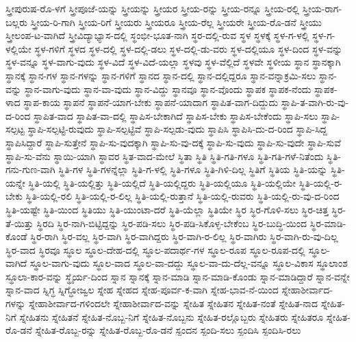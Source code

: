 ಸ್ತ್ರೀಪುರುಷ-ರೊ-ಳಗೆ
ಸ್ತ್ರೀಪೂಜೆ-ಯನ್ನು
ಸ್ತ್ರೀಯನ್ನು
ಸ್ತ್ರೀಯರ
ಸ್ತ್ರೀಯ-ರನ್ನು
ಸ್ತ್ರೀಯ-ರನ್ನೂ
ಸ್ತ್ರೀಯ-ರಲ್ಲಿ
ಸ್ತ್ರೀಯ-ರಾಗ-ಬಲ್ಲರು
ಸ್ತ್ರೀಯ-ರಿ-ಗಾಗಿ
ಸ್ತ್ರೀಯ-ರಿಗೆ
ಸ್ತ್ರೀಯರು
ಸ್ತ್ರೀಯರೂ
ಸ್ತ್ರೀಯ-ರೆಲ್ಲ
ಸ್ತ್ರೀಯರೇ
ಸ್ತ್ರೀಯ-ರೊ-ಡನೆ
ಸ್ತ್ರೀಯು
ಸ್ತ್ರೀಲಂಪ-ಟ-ವಾಗಿದೆ
ಸ್ತ್ರೀವಿದ್ಯಾಭ್ಯಾಸ-ದಲ್ಲಿ
ಸ್ಥಂಭೀ-ಭೂತ-ನಾಗಿ
ಸ್ಥರ-ದಲ್ಲಿ-ರುವ
ಸ್ಥಳ
ಸ್ಥಳಕ್ಕೆ
ಸ್ಥಳ-ಗ-ಳಲ್ಲಿ
ಸ್ಥಳ-ಗ-ಳಲ್ಲಿಯೇ
ಸ್ಥಳ-ಗಳಿಗೆ
ಸ್ಥಳದ
ಸ್ಥಳ-ದಲ್ಲಿ
ಸ್ಥಳ-ದಲ್ಲಿ-ಡಲು
ಸ್ಥಳ-ದಲ್ಲಿ-ಡು-ವರು
ಸ್ಥಳ-ದಲ್ಲಿಯೂ
ಸ್ಥಳ-ದಿಂದ
ಸ್ಥಳ-ವನ್ನು
ಸ್ಥಳ-ವನ್ನೂ
ಸ್ಥಳ-ವಾಗು-ವುದು
ಸ್ಥಳ-ವಿದೆ
ಸ್ಥಳ-ವಿದೆ-ಯಲ್ಲಾ
ಸ್ಥಳವು
ಸ್ಥಳ-ವೆಲ್ಲಿದೆ
ಸ್ಥಳವೇ
ಸ್ಥಳೀಯ
ಸ್ಥಾನ
ಸ್ಥಾನಕ್ಕಾಗಿ
ಸ್ಥಾನಕ್ಕೆ
ಸ್ಥಾನ-ಗಳ
ಸ್ಥಾನ-ಗಳನ್ನು
ಸ್ಥಾನ-ಗಳಿಗೆ
ಸ್ಥಾನದ
ಸ್ಥಾನ-ದಲ್ಲಿ
ಸ್ಥಾನ-ದಲ್ಲಿದ್ದರೂ
ಸ್ಥಾನ-ವನ್ನಾಕ್ರಮಿ-ಸಲು
ಸ್ಥಾನ-ವನ್ನು
ಸ್ಥಾನ-ವಾಗು-ವುದು
ಸ್ಥಾನ-ವಾ-ವುದು
ಸ್ಥಾನ-ವಿದ್ದು
ಸ್ಥಾನವೂ
ಸ್ಥಾನ-ವೊಂದು
ಸ್ಥಾಪಕ
ಸ್ಥಾಪಕ-ನೆಂದು
ಸ್ಥಾಪಕ-ಳಾದ
ಸ್ಥಾಪ-ಕಾಯ
ಸ್ಥಾಪನೆ
ಸ್ಥಾಪನೆ-ಯಾಗ-ಬೇಕು
ಸ್ಥಾಪನೆ-ಯಾದಾಗ
ಸ್ಥಾಪಿತ-ವಾಗ-ದಿದ್ದುದು
ಸ್ಥಾಪಿ-ತ-ವಾಗಿ-ರು-ವು-ದ-ರಿಂದ
ಸ್ಥಾಪಿತ-ವಾದ
ಸ್ಥಾಪಿತ-ವಾ-ದಲ್ಲಿ
ಸ್ಥಾಪಿಸ-ಬೇಕಾಗಿದೆ
ಸ್ಥಾಪಿಸ-ಬೇಕು
ಸ್ಥಾಪಿಸ-ಬೇಕೆಂದು
ಸ್ಥಾಪಿ-ಸಲು
ಸ್ಥಾಪಿ-ಸಲ್ಪಟ್ಟ
ಸ್ಥಾಪಿ-ಸಲ್ಪಟ್ಟಿ-ರುವುದು
ಸ್ಥಾಪಿ-ಸಲ್ಪಟ್ಟಿವೆ
ಸ್ಥಾಪಿ-ಸಲ್ಪಡು-ವುದು
ಸ್ಥಾಪಿಸಿ
ಸ್ಥಾಪಿಸಿ-ದು-ದ-ರಿಂದ
ಸ್ಥಾಪಿ-ಸಿದ್ದ
ಸ್ಥಾಪಿಸಿದ್ದಾರೆ
ಸ್ಥಾಪಿ-ಸುತ್ತೇನೆ
ಸ್ಥಾಪಿ-ಸು-ವುದಕ್ಕಾಗಿ
ಸ್ಥಾಪಿ-ಸು-ವು-ದಕ್ಕೆ
ಸ್ಥಾಪಿ-ಸು-ವುದು
ಸ್ಥಾಪಿ-ಸು-ವುದೇ
ಸ್ಥಾಪಿ-ಸುವೆ
ಸ್ಥಾಪಿ-ಸು-ವೆನು
ಸ್ಥಾಯಿ-ಯಾಗಿ
ಸ್ಥಾವರ
ಸ್ಥಿತ-ವಾದ-ಮೇಲೆ
ಸ್ಥಿತಾ
ಸ್ಥಿತಿ
ಸ್ಥಿತಿ-ಗತಿ-ಗಳೂ
ಸ್ಥಿತಿ-ಗತಿ-ಗಳೆ-ನಿತೆಂದು
ಸ್ಥಿತಿ-ಗನು-ಗುಣ-ವಾಗಿ
ಸ್ಥಿತಿ-ಗಳ
ಸ್ಥಿತಿ-ಗಳನ್ನೆಲ್ಲಾ
ಸ್ಥಿತಿ-ಗ-ಳಲ್ಲಿ
ಸ್ಥಿತಿ-ಗಳೂ
ಸ್ಥಿತಿ-ಗಿಳಿ-ದಿಲ್ಲ
ಸ್ಥಿತಿಗೆ
ಸ್ಥಿತಿಯ
ಸ್ಥಿತಿ-ಯನ್ನು
ಸ್ಥಿತಿ-ಯನ್ನೇ
ಸ್ಥಿತಿ-ಯಲ್ಲಿ
ಸ್ಥಿತಿ-ಯಲ್ಲಿತ್ತು
ಸ್ಥಿತಿ-ಯಲ್ಲಿದೆ
ಸ್ಥಿತಿ-ಯಲ್ಲಿದ್ದರು
ಸ್ಥಿತಿ-ಯಲ್ಲಿಯೂ
ಸ್ಥಿತಿ-ಯಲ್ಲಿಯೇ
ಸ್ಥಿತಿ-ಯಲ್ಲಿ-ರ-ಬೇಕು
ಸ್ಥಿತಿ-ಯಲ್ಲಿ-ರಲಿ
ಸ್ಥಿತಿ-ಯಲ್ಲಿ-ರ-ಲಿಲ್ಲ
ಸ್ಥಿತಿ-ಯಲ್ಲಿ-ರುತ್ತಾನೆ
ಸ್ಥಿತಿ-ಯಲ್ಲಿ-ರುವರು
ಸ್ಥಿತಿ-ಯಲ್ಲಿ-ರು-ವು-ದ-ರಿಂದ
ಸ್ಥಿತಿ-ಯಷ್ಟೇ
ಸ್ಥಿತಿ-ಯಿಂದ
ಸ್ಥಿತಿಯು
ಸ್ಥಿತಿ-ಯುಂಟಾ-ದರೆ
ಸ್ಥಿತಿ-ಯೆಲ್ಲಾ
ಸ್ಥಿತಿಯೇ
ಸ್ಥಿರ
ಸ್ಥಿರ-ಗೊಳಿ-ಸಲು
ಸ್ಥಿರ-ಚಿತ್ತ
ಸ್ಥಿರ-ತೆ-ಯಿತ್ತು
ಸ್ಥಿರದಿ
ಸ್ಥಿರ-ನಾಗಿ-ಬಿಟ್ಟಿದ್ದನ್ನು
ಸ್ಥಿರ-ಪಡಿ-ಸಲು
ಸ್ಥಿರ-ಪಡಿ-ಸಿಕೊಳ್ಳ-ಬೇಕೆಂಬ
ಸ್ಥಿರ-ಬುದ್ಧಿ-ಯಿಂದ
ಸ್ಥಿರ-ಮಾಡಿ-ಕೊಂಡೆ
ಸ್ಥಿರ-ರಾಗಿ
ಸ್ಥಿರ-ವಲ್ಲ
ಸ್ಥಿರ-ವಾಗಿ
ಸ್ಥಿರ-ವಾಗಿದ್ದರು
ಸ್ಥಿರ-ವಾಗಿ-ರ-ಲಿಲ್ಲ
ಸ್ಥಿರ-ವಾಗಿರು
ಸ್ಥಿರ-ವಾಗಿ-ರು-ವು-ದಿಲ್ಲ
ಸ್ಥಿರ-ವಾದ
ಸ್ಥಿರವೂ
ಸ್ಥೂಲ
ಸ್ಥೂಲ-ದೇಹ-ದಲ್ಲಿ
ಸ್ಥೂಲ-ಪದಾರ್ಥ-ಗಳ
ಸ್ಥೂಲ-ರೂಪ
ಸ್ಥೂಲ-ರೂಪ-ದಲ್ಲಿ
ಸ್ಥೂಲ-ವಾಗಿದೆ
ಸ್ಥೂಲ-ವಾಗು-ವುದು
ಸ್ಥೂಲ-ವಾದ
ಸ್ಥೂಲ-ವಾ-ದದ್ದು
ಸ್ಥೂಲ-ವಾ-ದು-ದೆಲ್ಲ-ವನ್ನೂ
ಸ್ಥೂಲ-ವಿಕಾಸ
ಸ್ಥೂಲಾಂಶ
ಸ್ಥೂಲಾ-ಕಾರ-ವನ್ನು
ಸ್ಥೈರ್ಯ-ದಿಂದ
ಸ್ನಾನ
ಸ್ನಾನಕ್ಕೆ
ಸ್ನಾನ-ಮಾಡಿ
ಸ್ನಾನ-ಮಾಡಿ-ಕೊಂಡು
ಸ್ನಾನ-ಮಾಡಿದ್ದಾರೆ
ಸ್ನಾನ-ವನ್ನೇ
ಸ್ನಾನ-ವಾದ
ಸ್ನಿಗ್ಧ
ಸ್ನಿಗ್ಧೋಜ್ವಲ
ಸ್ನೇಹ
ಸ್ನೇಹದ
ಸ್ನೇಹ-ಪೂರ್ವ-ಕ-ವಾಗಿ
ಸ್ನೇಹ-ಭಾವ-ನೆ-ಯಿಂದ
ಸ್ನೇಹಾಶೀರ್ವಾದ-ಗಳನ್ನು
ಸ್ನೇಹಾಶೀರ್ವಾದ-ಗಳಿಂದಲೇ
ಸ್ನೇಹಾಶೀರ್ವಾದ-ವನ್ನು
ಸ್ನೇಹಿತ
ಸ್ನೇಹಿತನ
ಸ್ನೇಹಿತ-ನಂತೆ
ಸ್ನೇಹಿತ-ನಾದ
ಸ್ನೇಹಿತ-ನಿಗೆ
ಸ್ನೇಹಿತನು
ಸ್ನೇಹಿತನೆ
ಸ್ನೇಹಿತ-ನೊಬ್ಬ-ನಿಗೆ
ಸ್ನೇಹಿತ-ನೊಬ್ಬನು
ಸ್ನೇಹಿತ-ರಲ್ಲೊಬ್ಬರು
ಸ್ನೇಹಿತರು
ಸ್ನೇಹಿತರೂ
ಸ್ನೇಹಿತ-ರೊ-ಡನೆ
ಸ್ನೇಹಿತ-ರೊಬ್ಬ-ರನ್ನು
ಸ್ನೇಹಿತ-ರೊಬ್ಬ-ರೊ-ಡನೆ
ಸ್ಪಂದನ
ಸ್ಪಂದಿ-ಸಲು
ಸ್ಪಂದಿಸಿ
ಸ್ಪಂದಿಸಿ-ರಲು
